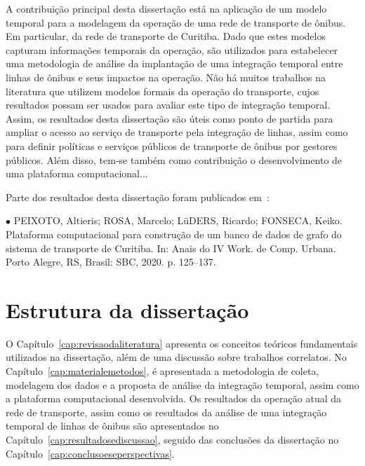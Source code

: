 A contribuição principal desta dissertação está na aplicação de um modelo temporal para a modelagem da operação de uma rede de transporte de ônibus. Em particular, da rede de transporte de Curitiba. Dado que estes modelos capturam informações temporais da operação, são utilizados para estabelecer uma metodologia de análise da implantação de uma integração temporal entre linhas de ônibus e seus impactos na operação. Não há muitos trabalhos na literatura que utilizem modelos formais da operação do transporte, cujos resultados possam ser usados para avaliar este tipo de integração temporal. Assim, os resultados desta dissertação são úteis como ponto de partida para ampliar o acesso ao serviço de transporte pela integração de linhas, assim como para definir políticas e serviços públicos de transporte de ônibus por gestores públicos. Além disso, tem-se também como contribuição o desenvolvimento de uma plataforma computacional...

Parte dos resultados desta dissertação foram publicados em~\cite{courb2020}:

\noindent
$\bullet$ PEIXOTO, Altieris; ROSA, Marcelo; LüDERS, Ricardo; FONSECA, Keiko. Plataforma computacional para construção de um banco de dados de grafo do sistema de transporte de Curitiba. In: Anais do IV Work. de Comp. Urbana. Porto Alegre, RS, Brasil: SBC, 2020. p. 125–137.
 
 

\section{Estrutura da dissertação}
\label{sec:estrutura}

O Capítulo~\ref{cap:revisaodaliteratura} apresenta os conceitos teóricos fundamentais utilizados na dissertação, além de uma discussão sobre trabalhos correlatos. No Capítulo~\ref{cap:materialemetodos}, é apresentada a metodologia de coleta, modelagem dos dados e a proposta de análise da integração temporal, assim como a plataforma computacional desenvolvida. Os resultados da operação atual da rede de transporte, assim como os resultados da análise de uma integração temporal de linhas de ônibus são apresentados no Capítulo~\ref{cap:resultadosediscussao}, seguido das conclusões da dissertação no Capítulo~\ref{cap:conclusoeseperspectivas}.


